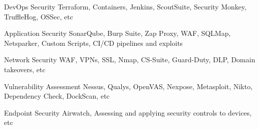 
\begin{cvskills}

  \cvskill
    {DevOps Security} %
    {Terraform, Containers, Jenkins, ScoutSuite, Security Monkey, TruffleHog, OSSec, etc} %

  \cvskill
    {Application Security} %
    {SonarQube, Burp Suite, Zap Proxy, WAF, SQLMap, Netsparker, Custom Scripts, CI/CD pipelines and exploits } %

  \cvskill
    {Network Security} %
    {WAF, VPNs, SSL, Nmap, CS-Suite, Guard-Duty, DLP, Domain takeovers, etc } %

  \cvskill
    {Vulnerability Assessment } %
    {Nessus, Qualys, OpenVAS, Nexpose, Metasploit, Nikto, Dependency Check, DockScan, etc } %


  \cvskill
    {Endpoint Security} %
    {Airwatch, Assessing and applying security controls to devices, etc } %

\end{cvskills}
